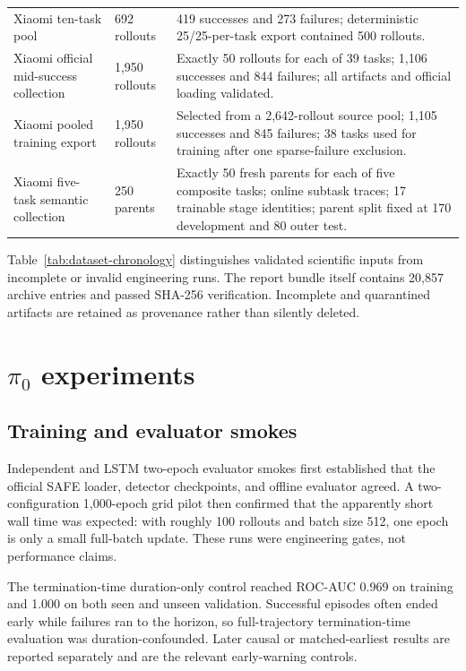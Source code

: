 \documentclass[11pt,a4paper]{article}
\begin{document}
\begin{longtable}{p{}p{}p{}}
Xiaomi ten-task pool & 692 rollouts & 419 successes and 273 failures; deterministic 25/25-per-task export contained 500 rollouts.\\
Xiaomi official mid-success collection & 1,950 rollouts & Exactly 50 rollouts for each of 39 tasks; 1,106 successes and 844 failures; all artifacts and official loading validated.\\
Xiaomi pooled training export & 1,950 rollouts & Selected from a 2,642-rollout source pool; 1,105 successes and 845 failures; 38 tasks used for training after one sparse-failure exclusion.\\
Xiaomi five-task semantic collection & 250 parents & Exactly 50 fresh parents for each of five composite tasks; online subtask traces; 17 trainable stage identities; parent split fixed at 170 development and 80 outer test.\\
\bottomrule
\end{longtable}

Table~\ref{tab:dataset-chronology} distinguishes validated scientific inputs
from incomplete or invalid engineering runs. The report bundle itself contains
20,857 archive entries and passed SHA-256 verification. Incomplete and
quarantined artifacts are retained as provenance rather than silently deleted.

\section{\texorpdfstring{$\pi_0$}{pi0} experiments}

\subsection{Training and evaluator smokes}
Independent and LSTM two-epoch evaluator smokes first established that the official SAFE loader, detector checkpoints, and offline evaluator agreed. A two-configuration 1,000-epoch grid pilot then confirmed that the apparently short wall time was expected: with roughly 100 rollouts and batch size 512, one epoch is only a small full-batch update. These runs were engineering gates, not performance claims.

The termination-time duration-only control reached ROC-AUC 0.969 on training
and 1.000 on both seen and unseen validation. Successful episodes often ended
early while failures ran to the horizon, so full-trajectory termination-time
evaluation was duration-confounded. Later causal or matched-earliest results
are reported separately and are the relevant early-warning controls.
\end{document}
